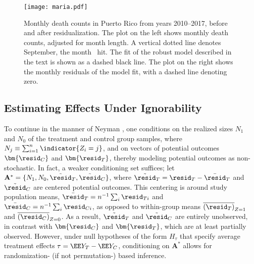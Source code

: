 \begin{figure}
\centering
\texttt{[image: maria.pdf]}
\caption{Monthly death counts in Puerto Rico from years 2010--2017, before and after
  residualization. The plot on the left shows monthly death counts,
  adjusted for month length. A vertical dotted line denotes September,
  the month \maria\ hit. The fit of the robust model described in the
  text is shown as a dashed black line. The plot on the right shows
  the monthly residuals of the model fit, with a dashed line denoting
  zero.}
\label{fig:maria}
\end{figure}


\subsection{Estimating Effects Under Ignorability}\label{sec:rand}




To continue in the manner of Neyman
\citeyearpar{neyman:1935}, one conditions on the realized sizes
$N_{1}$ and $N_{0}$ of the treatment and control group samples, where
 $N_{j} \equiv \sum_{i=1}^{n} \indicator{Z_{i}=j}$, and on vectors of
 potential outcomes $\bm{\resid_C}$ and $\bm{\resid_T}$, thereby modeling
 potential outcomes as non-stochastic.
In fact, a weaker conditioning set suffices; let
$\mathbf{A}^{*}=\{N_{1},N_{0},\tilde{\mathbf{\resid}}_{T},\tilde{\mathbf{\resid}}_{C}\}$,
where  $\tilde{\mathbf{\resid}}_{T} = \mathbf{\resid}_{T} - \bar{\resid}_{T}$ and
$\tilde{\mathbf{\resid}}_C$ are centered potential outcomes.
This centering is around study population means,
$\bar{\resid}_{T} = n^{-1}\sum_{i}\resid_{Ti}$ and
$\bar{\resid}_{C} = n^{-1}\sum_{i}\resid_{Ci}$, as opposed to within-group means
$\overline{(\resid_{T})}_{Z=1}$
and
$\overline{(\resid_{C})}_{Z=0}$.
As a result, $\tilde{\mathbf{\resid}}_{T}$ and $\tilde{\mathbf{\resid}}_{C}$ are
entirely unobserved, in contrast with $\bm{\resid_C}$ and $\bm{\resid_T}$, which
are at least partially observed.
However, under null hypotheses of the form $H_\tau$ that specify
average treatment effects $\tau=\EE Y_T-\EE Y_C$, conditioning
on $\mathbf{A}^{*}$ allows for randomization- (if not permutation-)
based inference.

